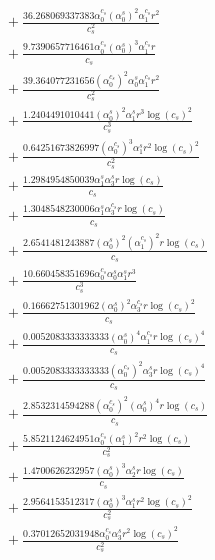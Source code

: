 \documentclass[10pt]{article}
\begin{document}
\begin{align*}
&{}  + \frac{36.268069337383 \alpha_{0}^{c_s} \left(\alpha_{0}^s\right)^{2} \alpha_{1}^{c_s} r^{2}}{c_{s}^{2}} \\
&{}  + \frac{9.7390657716461 \alpha_{0}^{c_s} \left(\alpha_{0}^s\right)^{3} \alpha_{1}^{c_s} r}{c_{s}} \\
&{}  + \frac{39.364077231656 \left(\alpha_{0}^{c_s}\right)^{2} \alpha_{0}^s \alpha_{1}^{c_s} r^{2}}{c_{s}^{2}} \\
&{}  + \frac{1.2404491010441 \left(\alpha_{0}^s\right)^{2} \alpha_{1}^s r^{3} \log{\left(c_{s} \right)}^{2}}{c_{s}^{3}} \\
&{}  + \frac{0.64251673826997 \left(\alpha_{0}^{c_s}\right)^{3} \alpha_{1}^s r^{2} \log{\left(c_{s} \right)}^{2}}{c_{s}^{2}} \\
&{}  + \frac{1.2984954850039 \alpha_{1}^s \alpha_{3}^s r \log{\left(c_{s} \right)}}{c_{s}} \\
&{}  + \frac{1.3048548230006 \alpha_{1}^s \alpha_{3}^{c_s} r \log{\left(c_{s} \right)}}{c_{s}} \\
&{}  + \frac{2.6541481243887 \left(\alpha_{0}^s\right)^{2} \left(\alpha_{1}^{c_s}\right)^{2} r \log{\left(c_{s} \right)}}{c_{s}} \\
&{}  + \frac{10.660458351696 \alpha_{0}^{c_s} \alpha_{0}^s \alpha_{1}^s r^{3}}{c_{s}^{3}} \\
&{}  + \frac{0.16662751301962 \left(\alpha_{0}^s\right)^{2} \alpha_{3}^{c_s} r \log{\left(c_{s} \right)}^{2}}{c_{s}} \\
&{}  + \frac{0.0052083333333333 \left(\alpha_{0}^s\right)^{4} \alpha_{1}^{c_s} r \log{\left(c_{s} \right)}^{4}}{c_{s}} \\
&{}  + \frac{0.0052083333333333 \left(\alpha_{0}^{c_s}\right)^{2} \alpha_{3}^s r \log{\left(c_{s} \right)}^{4}}{c_{s}} \\
&{}  + \frac{2.8532314594288 \left(\alpha_{0}^{c_s}\right)^{2} \left(\alpha_{0}^s\right)^{4} r \log{\left(c_{s} \right)}}{c_{s}} \\
&{}  + \frac{5.8521124624951 \alpha_{0}^{c_s} \left(\alpha_{1}^s\right)^{2} r^{2} \log{\left(c_{s} \right)}}{c_{s}^{2}} \\
&{}  + \frac{1.4700626232957 \left(\alpha_{0}^s\right)^{3} \alpha_{2}^s r \log{\left(c_{s} \right)}}{c_{s}} \\
&{}  + \frac{2.9564153512317 \left(\alpha_{0}^s\right)^{3} \alpha_{1}^s r^{2} \log{\left(c_{s} \right)}^{2}}{c_{s}^{2}} \\
&{}  + \frac{0.37012652031948 \alpha_{0}^{c_s} \alpha_{3}^s r^{2} \log{\left(c_{s} \right)}^{2}}{c_{s}^{2}} \\

\end{align*}
\end{document}
